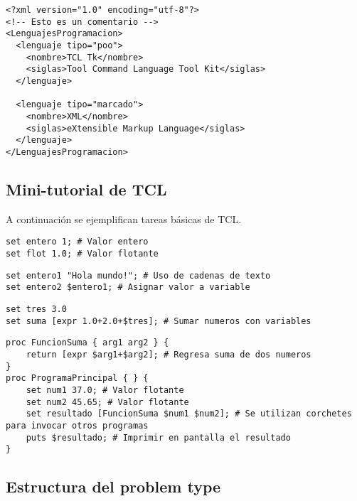 \documentclass[10pt, a4paper, twocolumn]{article} %
\begin{document}
\lstset{language=XML} 
\begin{lstlisting}[caption={Ejemplo de una clasificación de lenguajes en XML.}]
<?xml version="1.0" encoding="utf-8"?>
<!-- Esto es un comentario -->
<LenguajesProgramacion>
  <lenguaje tipo="poo">
    <nombre>TCL Tk</nombre> 
    <siglas>Tool Command Language Tool Kit</siglas>   
  </lenguaje>
  
  <lenguaje tipo="marcado">
    <nombre>XML</nombre>
    <siglas>eXtensible Markup Language</siglas>
  </lenguaje>
</LenguajesProgramacion>
\end{lstlisting}

\subsection{Mini-tutorial de TCL}

A continuación se ejemplifican tareas básicas de TCL.

\lstset{language=tcl} 

\begin{lstlisting}[caption={Asignar valor a una variable.}]
set entero 1; # Valor entero
set flot 1.0; # Valor flotante 
\end{lstlisting}

\begin{lstlisting}[caption={Asignar valor de una variable a otra.}]
set entero1 "Hola mundo!"; # Uso de cadenas de texto
set entero2 $entero1; # Asignar valor a variable
\end{lstlisting}

\begin{lstlisting}[caption={Operaciones matemáticas.}]
set tres 3.0
set suma [expr 1.0+2.0+$tres]; # Sumar numeros con variables
\end{lstlisting}

\begin{lstlisting}[caption={Crear funciones o procedimientos (\textbf{\texttt{proc}}).}]
proc FuncionSuma { arg1 arg2 } {
	return [expr $arg1+$arg2]; # Regresa suma de dos numeros
}
proc ProgramaPrincipal { } {
	set num1 37.0; # Valor flotante 
	set num2 45.65; # Valor flotante 
	set resultado [FuncionSuma $num1 $num2]; # Se utilizan corchetes para invocar otros programas
	puts $resultado; # Imprimir en pantalla el resultado
}
\end{lstlisting}

\subsection{Estructura del problem type}
\end{document}
